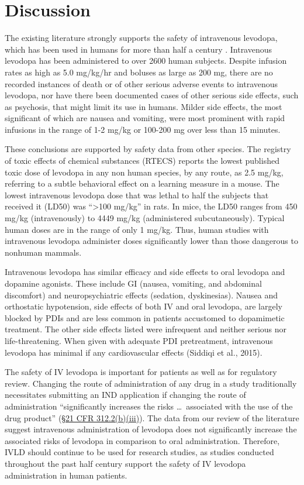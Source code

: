 \section{Discussion}
The existing literature strongly supports the safety of intravenous levodopa, which has been used in humans for more than half a century \cite{14430381}.  Intravenous levodopa has been administered to over 2600 human subjects.  Despite infusion rates as high as 5.0 mg/kg/hr and boluses as large as 200 mg, there are no recorded instances of death or of other serious adverse events to intravenous levodopa, nor have there been documented cases of other serious side effects, such as psychosis, that might limit its use in humans. Milder side effects, the most significant of which are nausea and vomiting, were most prominent with rapid infusions in the range of 1-2 mg/kg or 100-200 mg over less than 15 minutes\cite{5327616,Bbrung_1966,12865145,4555619,6540399,4880674}. 

These conclusions are supported by safety data from other species. The registry of toxic effects of chemical substances (RTECS) reports the lowest published toxic dose of levodopa in any non human species, by any route, as 2.5 mg/kg, referring to a subtle behavioral effect on a learning measure in a mouse.  The lowest intravenous levodopa dose that was lethal to half the subjects that received it (LD50) was ``>100 mg/kg'' in rats.  In mice, the LD50 ranges from 450 mg/kg (intravenously) to 4449 mg/kg (administered subcutaneously).  Typical human doses are in the range of only 1 mg/kg.  Thus, human studies with intravenous levodopa administer doses significantly lower than those dangerous to nonhuman mammals. 

Intravenous levodopa has similar efficacy and side effects to oral levodopa\cite{Connolly_2014} and dopamine agonists\cite{Bonuccelli_2008}.  These include GI (nausea, vomiting, and abdominal discomfort) and neuropsychiatric effects (sedation, dyskinesias).  Nausea and orthostatic hypotension, side effects of both IV and oral levodopa, are largely blocked by PDIs and are less common in patients accustomed to dopamimetic treatment.  The other side effects listed were infrequent and neither serious nor life-threatening. When given with adequate PDI pretreatment, intravenous levodopa has minimal if any cardiovascular effects (Siddiqi et al., 2015).

The safety of IV levodopa is important for patients as well as for regulatory review.  Changing the route of administration of any drug in a study traditionally necessitates submitting an IND application if changing the route of administration “significantly increases the risks \dots\, associated with the use of the drug product” (\href{http://www.accessdata.fda.gov/scripts/cdrh/cfdocs/cfcfr/CFRSearch.cfm?fr=312.2}{\S 21 CFR 312.2(b)(iii)}).  The data from our review of the literature suggest intravenous administration of levodopa does not significantly increase the associated risks of levodopa in comparison to oral administration.  Therefore, IVLD should continue to be used for research studies, as studies conducted throughout the past half century support the safety of IV levodopa administration in human patients.